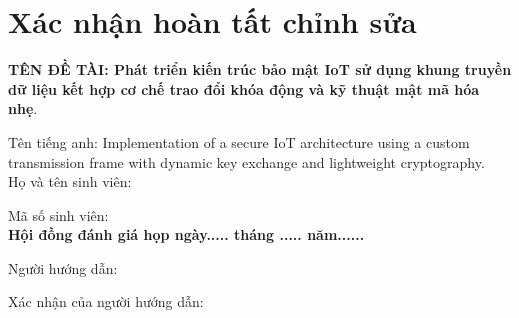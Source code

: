 \chapter*{Xác nhận hoàn tất chỉnh sửa}
{\textbf{TÊN ĐỀ TÀI: Phát triển kiến trúc bảo mật IoT sử dụng khung truyền dữ liệu kết hợp cơ chế trao đổi khóa động và kỹ thuật mật mã hóa nhẹ}.}

{\small Tên tiếng anh: Implementation of a secure IoT architecture using a custom transmission frame with dynamic key exchange and lightweight cryptography.}\\[.1 cm]

Họ và tên sinh viên: \tenSV

Mã số sinh viên: \mssv \\[.1 cm]

\textbf{Hội đồng đánh giá họp ngày..... tháng ..... năm......}


\vspace{.2 cm}
Người hướng dẫn: \tenGVHD

Xác nhận của người hướng dẫn: